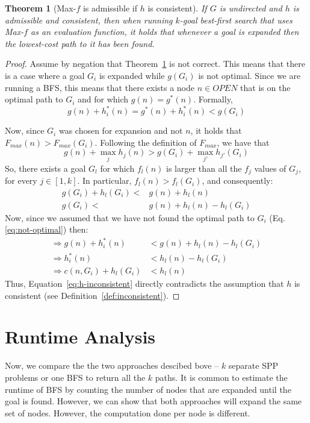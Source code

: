 \documentclass{aicom2e}
\newtheorem{theorem}{Theorem}
\newcommand{\kgbfs}{$k$-goal best-first search}
\begin{document}
 
\begin{theorem}[Max-$f$ is admissible if $h$ is consistent]
If $G$ is undirected and $h$ is admissible and consistent, 
then when running \kgbfs{} that uses Max-$f$ as an evaluation function,
it holds that whenever a goal is expanded then the lowest-cost path to it has been found. 
\label{the:max-f}
\end{theorem}
 \begin{proof}
 Assume by negation that Theorem~\ref{the:max-f} is not correct. This means
 that there is a case where a goal $G_i$ is expanded while $g(G_i)$ is not optimal. Since we are running a BFS, this means that there exists a node $n\in OPEN$ that is on the optimal path to $G_i$ and for which $g(n)=g^*(n)$. Formally, 
 \begin{equation}
     g(n)+h_i^*(n) = g^*(n)+h_i^*(n) < g(G_i)
    \label{eq:not-optimal}
 \end{equation}
 
 Now, since $G_i$ was chosen for expansion and not $n$, it holds that $F_{max}(n)  > F_{max}(G_i)$. Following the definition of $F_{max}$, we have that
 \begin{equation}
     g(n)+\max_j h_j(n) > g(G_i) + \max_{j'} h_{j'}(G_i)
 \end{equation}
 So, there exists a goal $G_l$ for which $f_l(n)$ is larger than 
 all the $f_j$ values of $G_j$, for every $j\in [1,k]$. In particular, 
 $f_l(n)>f_l(G_i)$, and consequently:
 \begin{align}
     g(G_i)+h_l(G_i) < & g(n)+h_l(n) \\
     g(G_i) < & g(n)+h_l(n) - h_l(G_i) 
 \end{align} 
Now, since we assumed that we have not found the optimal path to $G_i$ (Eq.~ \ref{eq:not-optimal}) then:
\begin{align}
\Rightarrow g(n)+h^*_i(n)  & < g(n)+h_l(n) - h_l(G_i)\\
\Rightarrow h^*_i(n)  & < h_l(n) - h_l(G_i)\\
\Rightarrow c(n,G_i) + h_l(G_i) & < h_l(n) \label{eq:h-inconsistent} 
\end{align}
Thus, Equation~\ref{eq:h-inconsistent} directly contradicts the assumption
that $h$ is consistent (see Definition~\ref{def:inconsistent}). 
\end{proof} 


\section{Runtime Analysis}
Now, we compare the the two approaches descibed bove -- $k$ separate SPP problems or one BFS to return all the $k$ paths. 
It is common to estimate the runtime of BFS by counting the number of nodes that are expanded until the goal is found. However, we can show that both approaches will expand the same set of nodes.  However, the computation done per node is different. 
\end{document}
